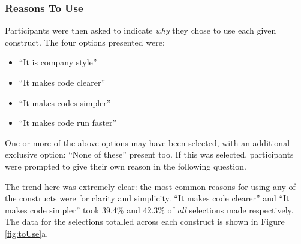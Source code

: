 \documentclass{article}
\begin{document}
        \subsubsection{Reasons To Use}
        \label{subsubsec:toUse}
            Participants were then asked to indicate \emph{why} they chose to use each given construct. The four options presented were:
            \begin{itemize}
                \item ``It is company style''
                \item ``It makes code clearer''
                \item ``It makes codes simpler''
                \item ``It makes code run faster''
            \end{itemize}
            One or more of the above options may have been selected, with an additional exclusive option: ``None of these'' present too. If this was selected, participants were prompted to give their own reason in the following question.
            \newline

            The trend here was extremely clear: the most common reasons for using any of the constructs were for clarity and simplicity. ``It makes code clearer'' and ``It makes code simpler'' took 39.4\% and 42.3\% of \emph{all} selections made respectively. The data for the selections totalled across each construct is shown in Figure \ref{fig:toUse}a.
\end{document}
